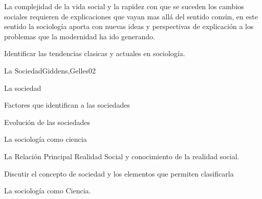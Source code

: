 \begin{syllabus}


\begin{justification}
La complejidad de la vida social y la rapidez con que se suceden los cambios sociales requieren 
de explicaciones que vayan mas allá del sentido común, en este sentido la sociología 
aporta con nuevas ideas y perspectivas de explicación a los problemas que la modernidad 
ha ido generando.
\end{justification}

\begin{goals}
\item Identificar las tendencias clasicas y actuales en sociología.
\end{goals}

\begin{outcomes}
\end{outcomes}

\begin{unit}{La Sociedad}{Giddens,Gelles}{0}{2}
    \begin{topics}
      \item La sociedad
      \item Factores que identifican a las sociedades
      \item Evolución de las sociedades
      \item La sociología como ciencia
      \item La Relación Principal Realidad Social y conocimiento de la realidad social.
    \end{topics}
    \begin{learningoutcomes}
      \item Discutir el concepto de sociedad y los elementos que permiten clasificarla
      \item La sociología como Ciencia.
    \end{learningoutcomes}
\end{unit}


\end{syllabus}
